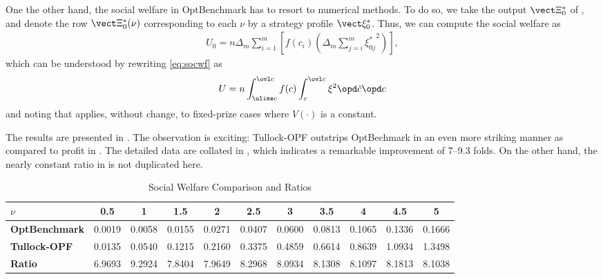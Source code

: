 \documentclass{sig-alternate-10pt}
\begin{document}
One the other hand, the social welfare in OptBenchmark has to resort to numerical methods. To do so, we take the output $\vect\Xi_0^*$ of , and denote the row $\vect\Xi_{0}^*(\nu)$ corresponding to each $\nu$ by a strategy profile $\vect\xi_{0}^*$. Thus, we can compute the social welfare as
\begin{align}
U_0 = n \Delta_m \sum_{i=1}^m \left[ f(c_i)
\left( \Delta_m \sum_{j=i}^m {\xi_{0j}^*}^2 \right) \right],
\end{align}
which can be understood by rewriting \eqref{eq:socwf} as
\[ U = n \int_{\uline c}^{\ovl c} f(c) \int_{c}^{\ovl c} \xi^2 \opd \tilde c \opd c \]
and noting that  applies, without change, to fixed-prize cases where $V(\cdot)$ is a constant.

The results are presented in . The observation is exciting: Tullock-OPF outstrips OptBechmark in an even more striking manner as compared to profit in . The detailed data are collated in , which indicates a remarkable improvement of 7--9.3 folds. On the other hand, the nearly constant ratio in  is not duplicated here.


\begin{table*}[ht]
\caption{Social Welfare Comparison and Ratios}\label{tab:socwf}
\centering
\begin{tabular}{l | c | c | c | c | c | c | c | c | c | c } \hline\hline 
{\bf $\nu$} & 0.5 & 1 & 1.5 & 2 & 2.5 & 3 & 3.5 & 4 & 4.5 & 5 \\ \hline 
{\bf OptBenchmark} & 0.0019 & 0.0058 & 0.0155 & 0.0271 & 0.0407 & 0.0600 & 0.0813 & 0.1065 & 0.1336 & 0.1666 \\ \hline
{\bf Tullock-OPF} & 0.0135 & 0.0540 & 0.1215 & 0.2160 & 0.3375 & 0.4859 & 0.6614 & 0.8639 & 1.0934 & 1.3498 \\ \hline
{\bf Ratio} & 6.9693 & 9.2924 & 7.8404 & 7.9649 & 8.2968 & 8.0934 & 8.1308 & 8.1097 & 8.1813 & 8.1038 \\ \hline\hline
\end{tabular}
\end{table*}
\end{document}
